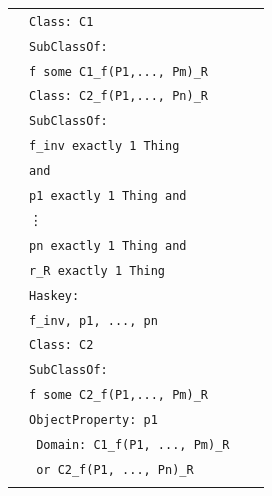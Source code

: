 \begin{longtable}{|>{\scriptsize}c|>{\scriptsize}l|>{\scriptsize}l|>{\scriptsize}p{0.8cm}|}
\begin{aligned}
         &\texttt{Class: C1}\\[\owlspacing]
         &\texttt{\hspace*{2mm}SubClassOf: }\\[\owlspacing]
         &\texttt{\hspace*{4mm}f some C1\_f(P1,..., Pm)\_R}\\    
  	&\texttt{Class: C2\_f(P1,..., Pn)\_R} \\[\owlspacing]
  	&\texttt{\hspace*{2mm}SubClassOf:}\\[\owlspacing]
  	&\texttt{\hspace*{4mm}f\_inv exactly 1 Thing}\\[\owlspacing]
  	&\texttt{\hspace*{6mm}and}\\[\owlspacing]
  	&\texttt{\hspace*{4mm}p1 exactly 1 Thing and}\\[\owlspacing]
  	&\texttt{\hspace*{6mm}} \vdots \\[\owlspacing]
  	&\texttt{\hspace*{4mm}pn exactly 1 Thing and}\\[\owlspacing]
  	&\texttt{\hspace*{4mm}r\_R exactly 1 Thing}\\[\owlspacing]
         &\texttt{\hspace*{2mm}Haskey:}\\[\owlspacing] 
         &\texttt{\hspace*{4mm}f\_inv, p1, ..., pn} \\[\owlspacing]  	
         &\texttt{Class: C2}\\[\owlspacing]
         &\texttt{\hspace*{2mm}SubClassOf: }\\[\owlspacing]
         &\texttt{\hspace*{4mm}f some C2\_f(P1,..., Pm)\_R}\\           
          &\texttt{ObjectProperty: p1}\\[\owlspacing]
          &\texttt{\hspace*{2mm} Domain: C1\_f(P1, ..., Pm)\_R} \\[\owlspacing] 
          &\texttt{\hspace*{4mm} or C2\_f(P1, ..., Pn)\_R}\\[\owlspacing]

\end{aligned}
\end{longtable}
